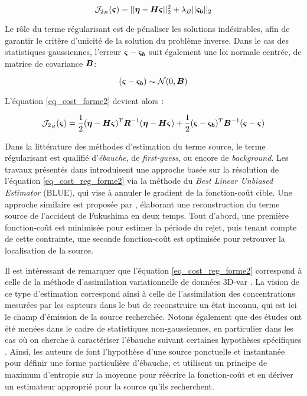  \begin{equation}
 \mathcal{J}_{2_B}({\bm{\varsigma}}) = ||{\bm{\eta}} - {\bm{H}} {\bm{\varsigma}}||_2^2 + \lambda_B ||{\bm{\varsigma_b}}||_2
 \label{eq_cost_MCO_reg}
 \end{equation}
 
 Le rôle du terme régularisant est de pénaliser les solutions indésirables, afin de garantir le critère d'unicité de la solution du problème inverse.  Dans le cas des statistiques gaussiennes, l'erreur  ${\bm{\varsigma}} - {\bm{\varsigma_b}}$ suit également une loi normale centrée, de matrice de covariance ${\bm{B}}$:
  
  \begin{equation}
  ({\bm{\varsigma}} - {\bm{\varsigma_b}}) \sim \mathcal{N}(0,{\bm{B}})
  \label{eq_erreur_ebauche}
  \end{equation}
  
  L'équation \eqref{eq_cost_forme2} devient alors \cite{Winiarek2011}: 
 
\begin{equation}
\mathcal{J}_{2_B}({\bm{\varsigma}}) = \dfrac{1}{2}({\bm{\eta}} - {\bm{H}} {\bm{\varsigma}})^T {\bm{R}}^{-1}({\bm{\eta}} - {\bm{H}}{\bm{\varsigma}}) + \dfrac{1}{2}({\bm{\varsigma}} - {\bm{\varsigma_b}})^T{\bm{B}}^{-1}({\bm{\varsigma}} - {\bm{\varsigma}})
\label{eq_cost_reg_forme2}
\end{equation}

Dans la littérature des méthodes d'estimation du terme source, le terme régularisant est qualifié d'\textit{ébauche}, de \textit{first-guess}, ou encore de \textit{background}. Les travaux présentés dans \cite{Winiarek2012} introduisent une approche basée sur la résolution de l'équation \eqref{eq_cost_reg_forme2} via la méthode du \textit{Best Linear Unbiased Estimator} (BLUE), qui vise à annuler le gradient de la fonction-coût cible. Une approche similaire est proposée par \cite{Saunier2013}, élaborant une reconstruction du terme source de l'accident de Fukushima en deux temps. Tout d'abord, une première fonction-coût est minimisée pour estimer la période du rejet, puis tenant compte de cette contrainte, une seconde fonction-coût est optimisée pour retrouver la localisation de la source. 

Il est intéressant de remarquer que l'équation \eqref{eq_cost_reg_forme2} correspond à celle de la méthode d'assimilation variationnelle de données 3D-var \cite{Courtier1998}. La vision de ce type d'estimation correspond  ainsi à celle de l'assimilation des concentrations mesurées par les capteurs dans le but de reconstruire un état inconnu, qui est ici le champ d'émission de la source recherchée. Notons également que des études ont été menées dans le cadre de statistiques non-gaussiennes, en particulier dans les cas où on cherche à caractériser l'ébauche suivant certaines hypothèses spécifiques \cite{Bocquet2005a}. Ainsi, les auteurs de \cite{Krysta2007} font l'hypothèse d'une source ponctuelle et instantanée pour définir une forme particulière d'ébauche, et utilisent un principe de maximum d'entropie sur la moyenne \cite{Jaynes1957} pour réécrire la fonction-coût et en dériver un estimateur approprié pour la source qu'ils recherchent.\\

